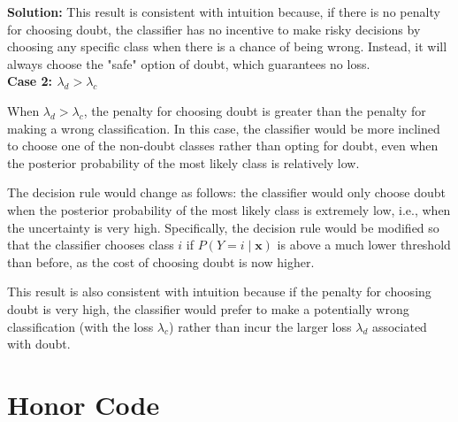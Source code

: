 \documentclass{article}
\newcommand{\Question}[1]{\Large \section{ #1 } \normalsize}
\newenvironment{solution}{\color{blue} \smallskip \textbf{Solution:}}{}
\begin{document}
\begin{enumerate}
\begin{solution}
This result is consistent with intuition because, if there is no penalty for choosing doubt, the classifier has no incentive to make risky decisions by choosing any specific class when there is a chance of being wrong. Instead, it will always choose the "safe" option of doubt, which guarantees no loss.\\

\textbf{Case 2: \(\lambda_d > \lambda_c\)}

When \(\lambda_d > \lambda_c\), the penalty for choosing doubt is greater than the penalty for making a wrong classification. In this case, the classifier would be more inclined to choose one of the non-doubt classes rather than opting for doubt, even when the posterior probability of the most likely class is relatively low.

The decision rule would change as follows: the classifier would only choose doubt when the posterior probability of the most likely class is extremely low, i.e., when the uncertainty is very high. Specifically, the decision rule would be modified so that the classifier chooses class \(i\) if \(P(Y = i \mid \mathbf{x})\) is above a much lower threshold than before, as the cost of choosing doubt is now higher.

This result is also consistent with intuition because if the penalty for choosing doubt is very high, the classifier would prefer to make a potentially wrong classification (with the loss \(\lambda_c\)) rather than incur the larger loss \(\lambda_d\) associated with doubt.





\end{solution}
\end{enumerate}

\newpage
\Question{Honor Code}
\end{document}
